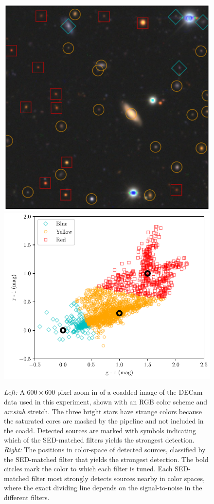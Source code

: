\documentclass[letterpaper,preprint]{aastex62}
\begin{document}
\begin{figure}
  \begin{center}
    \includegraphics[height=0.4\textwidth]{image-sources}
    \includegraphics[height=0.4\textwidth]{best-color}
    \caption{\emph{Left:} A $600 \times 600$-pixel zoom-in of a
      coadded image of the DECam data used in this experiment, shown
      with an RGB color scheme and \emph{arcsinh} stretch.  The three
      bright stars have strange colors because the saturated cores are
      masked by the pipeline and not included in the coadd.  Detected
      sources are marked with symbols indicating which of the
      SED-matched filters yields the strongest detection.
      \emph{Right:} The positions in color-space of detected sources,
      classified by the SED-matched filter that yields the strongest
      detection.  The bold circles mark the color to which each filter
      is tuned.  Each SED-matched filter most strongly detects sources
      nearby in color spaces, where the exact dividing line depends on
      the signal-to-noise in the different filters.
      \label{fig:expt}}
  \end{center}
\end{figure}
\end{document}

